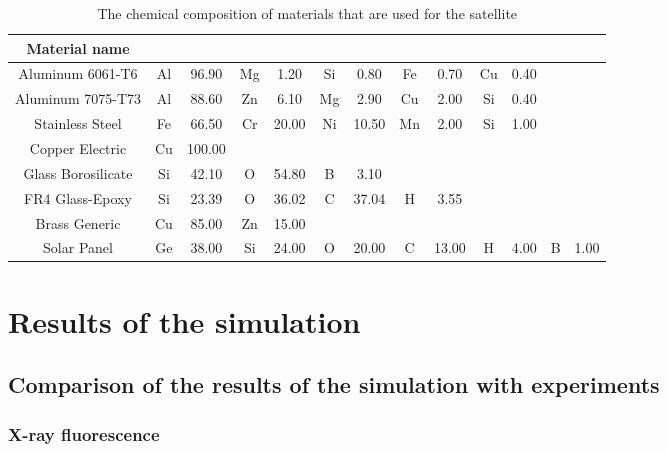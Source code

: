 \documentclass[12pt, a4paper,titlepage]{article}
\numberwithin{equation}{section}
\numberwithin{figure}{section}
\begin{document}
\begin{table}[h!]
\begin{center}
\begin{tabular}{ |c|c|c|c|c|c|c|c|c|c|c|c|c|} 
 \hline
Material name & &&&&&&&&&&& \\\hline

Aluminum 6061-T6 &	Al & 96.90 &	Mg &	1.20 &	Si &	0.80 &	Fe &	0.70 &	Cu &	0.40 & &\\\hline		
Aluminum 7075-T73 &	Al &	88.60 &	Zn &	6.10 &	Mg &	2.90 &	Cu &	2.00 &	Si &	0.40 & &\\\hline		
Stainless Steel &	Fe &	66.50 &	Cr &	20.00 &	Ni &	10.50	&Mn &	2.00 &	Si &	1.00 & &\\\hline		
Copper Electric  &Cu &	100.00 & & & & & & & & & &	\\\hline					
Glass Borosilicate &	Si &	42.10 &	O &	54.80 &	B &	3.10 & & & & & &\\\hline			
FR4 Glass-Epoxy &	Si &	23.39 &	O &	36.02 &	C &	37.04 &	H &	3.55 & & & &\\\hline		
Brass Generic &	Cu &	85.00 &	Zn &	15.00 & & & & & & & &\\\hline						
Solar Panel &	Ge &	38.00 &	Si &	24.00 &	O &	20.00 &	C &	13.00 &	H &	4.00 &	B &	1.00\\\hline
\end{tabular}
\end{center}
\caption{The chemical composition of materials that are used for the satellite}
\end{table}

\pagebreak

\section{Results of the simulation}


\subsection{Comparison of the results of the simulation with experiments}

\pagebreak


\subsubsection{X-ray fluorescence}
\end{document}
